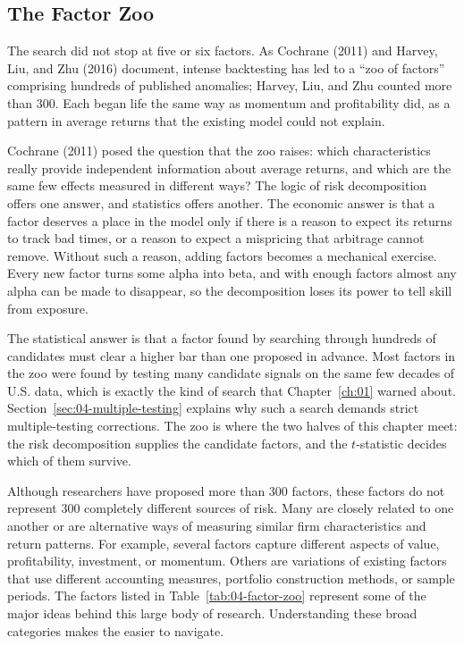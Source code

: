 \subsection{The Factor Zoo}
\label{sec:04-zoo}
The search did not stop at five or six factors. As Cochrane (2011) and Harvey, Liu, and Zhu (2016) document, intense backtesting has led to a ``zoo of factors'' comprising hundreds of published anomalies; Harvey, Liu, and Zhu counted more than 300. Each began life the same way as momentum and profitability did, as a pattern in average returns that the existing model could not explain.

Cochrane (2011) posed the question that the zoo raises: which characteristics really provide independent information about average returns, and which are the same few effects measured in different ways? The logic of risk decomposition offers one answer, and statistics offers another. The economic answer is that a factor deserves a place in the model only if there is a reason to expect its returns to track bad times, or a reason to expect a mispricing that arbitrage cannot remove. Without such a reason, adding factors becomes a mechanical exercise. Every new factor turns some alpha into beta, and with enough factors almost any alpha can be made to disappear, so the decomposition loses its power to tell skill from exposure.

The statistical answer is that a factor found by searching through hundreds of candidates must clear a higher bar than one proposed in advance. Most factors in the zoo were found by testing many candidate signals on the same few decades of U.S. data, which is exactly the kind of search that Chapter~\ref{ch:01} warned about. Section~\ref{sec:04-multiple-testing} explains why such a search demands strict multiple-testing corrections. The zoo is where the two halves of this chapter meet: the risk decomposition supplies the candidate factors, and the $t$-statistic decides which of them survive.

Although researchers have proposed more than 300 factors, these
factors do not represent 300 completely different sources of risk.
Many are closely related to one another or are alternative ways of
measuring similar firm characteristics and return patterns. For
example, several factors capture different aspects of value,
profitability, investment, or momentum. Others are variations of
existing factors that use different accounting measures, portfolio
construction methods, or sample periods. The factors listed in
Table~\ref{tab:04-factor-zoo} represent some of the major ideas
behind this large body of research. Understanding these broad
categories makes the  easier to navigate.

